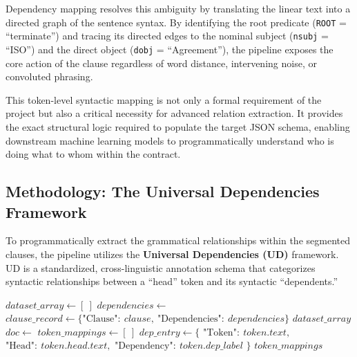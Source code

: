 \documentclass[twoside,final]{hcmut-report}
\begin{document}
\medskip

Dependency mapping resolves this ambiguity by translating the linear text into a directed graph of the sentence syntax. By identifying the root predicate (\texttt{ROOT} = ``terminate'') and tracing its directed edges to the nominal subject (\texttt{nsubj} = ``ISO'') and the direct object (\texttt{dobj} = ``Agreement''), the pipeline exposes the core action of the clause regardless of word distance, intervening noise, or convoluted phrasing.

\medskip

This token-level syntactic mapping is not only a formal requirement of the project but also a critical necessity for advanced relation extraction. It provides the exact structural logic required to populate the target JSON schema, enabling downstream machine learning models to programmatically understand who is doing what to whom within the contract.

\subsection{Methodology: The Universal Dependencies Framework}
To programmatically extract the grammatical relationships within the segmented clauses, the pipeline utilizes the \textbf{Universal Dependencies (UD)} framework. UD is a standardized, cross-linguistic annotation schema that categorizes syntactic relationships between a ``head'' token and its syntactic ``dependents.''
\begin{algorithm}[H]
  \footnotesize
  \caption{Syntactic Dependency Extraction and JSON Serialization}
  \begin{algorithmic}[1]
    \State $dataset\_array \gets [\ ]$
    \State $dependencies \gets$ 
    \State $clause\_record \gets \{\text{"Clause"}{:}\ clause,\ \text{"Dependencies"}{:}\ dependencies\}$
    \State {}
    \EndFor
    \State \Return $dataset\_array$
    \EndProcedure
    \State $doc \gets$  
    \State $token\_mappings \gets [\ ]$
     
    \State $dep\_entry \gets \{$
    \State \quad $\text{"Token"}{:}\ token.text,$
    \State \quad $\text{"Head"}{:}\ token.head.text,$ 
    \State \quad $\text{"Dependency"}{:}\ token.dep\_label$
    \State $\}$
    \State {}
    \EndIf
    \EndFor
    \State \Return $token\_mappings$
    \EndProcedure
  \end{algorithmic}
\end{algorithm}
\end{document}
